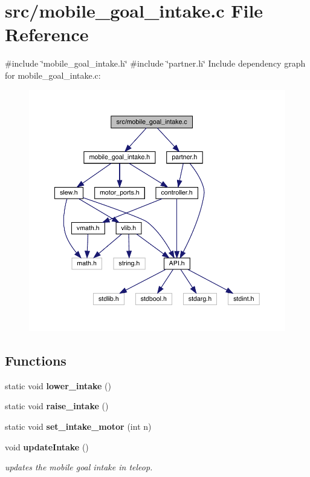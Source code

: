 \section{src/mobile\+\_\+goal\+\_\+intake.c File Reference}
\label{mobile__goal__intake_8c}
{\ttfamily \#include \char`\"{}mobile\+\_\+goal\+\_\+intake.\+h\char`\"{}}\newline
{\ttfamily \#include \char`\"{}partner.\+h\char`\"{}}\newline
Include dependency graph for mobile\+\_\+goal\+\_\+intake.\+c\+:\nopagebreak
\begin{figure}[H]
\begin{center}
\leavevmode
\includegraphics[width=350pt]{mobile__goal__intake_8c__incl}
\end{center}
\end{figure}
\subsection*{Functions}
\begin{DoxyCompactItemize}
\item 
static void \textbf{ lower\+\_\+intake} ()
\item 
static void \textbf{ raise\+\_\+intake} ()
\item 
static void \textbf{ set\+\_\+intake\+\_\+motor} (int n)
\item 
void \textbf{ update\+Intake} ()
\begin{DoxyCompactList}\small\item\em updates the mobile goal intake in teleop. \end{DoxyCompactList}\end{DoxyCompactItemize}


